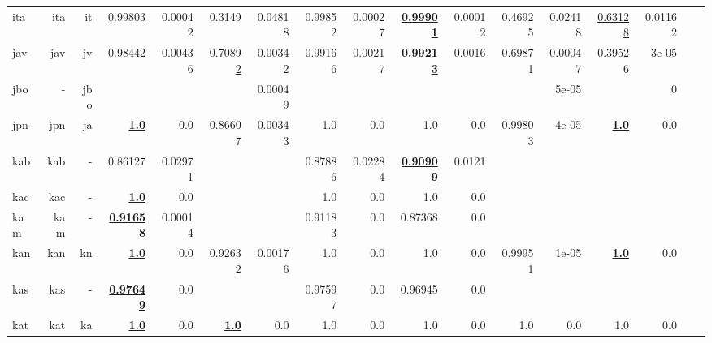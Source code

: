 \documentclass[11pt]{article}
\begin{document}
\begin{table*}[h]
{\begin{tabular}{lrrrrrrrrrrrrrrrr}
ita         & ita         & it         & 0.99803         & 0.00042         & 0.3149         & 0.04818         & 0.99852         & 0.00027         & \textbf{\underline{0.99901}}         & 0.00012         & 0.46925         & 0.02418         & \underline{0.63128}         & 0.01162         \\
jav         & jav         & jv         & 0.98442         & 0.00436         & \underline{0.70892}         & 0.00342         & 0.99166         & 0.00217         & \textbf{\underline{0.99213}}         & 0.0016         & 0.69871         & 0.00047         & 0.39526         & 3e-05         \\
jbo         & -         & jbo         &          &          &          & 0.00049         &          &          &          &          &          & 5e-05         &          & 0         \\
jpn         & jpn         & ja         & \textbf{\underline{1.0}}         & 0.0         & 0.86607         & 0.00343         & 1.0         & 0.0         & 1.0         & 0.0         & 0.99803         & 4e-05         & \textbf{\underline{1.0}}         & 0.0         \\
kab         & kab         & -         & 0.86127         & 0.02971         &          &          & 0.87886         & 0.02284         & \textbf{\underline{0.90909}}         & 0.0121         &          &          &          &          \\
kac         & kac         & -         & \textbf{\underline{1.0}}         & 0.0         &          &          & 1.0         & 0.0         & 1.0         & 0.0         &          &          &          &          \\
kam         & kam         & -         & \textbf{\underline{0.91658}}         & 0.00014         &          &          & 0.91183         & 0.0         & 0.87368         & 0.0         &          &          &          &          \\
kan         & kan         & kn         & \textbf{\underline{1.0}}         & 0.0         & 0.92632         & 0.00176         & 1.0         & 0.0         & 1.0         & 0.0         & 0.99951         & 1e-05         & \textbf{\underline{1.0}}         & 0.0         \\
kas         & kas         & -         & \textbf{\underline{0.97649}}         & 0.0         &          &          & 0.97597         & 0.0         & 0.96945         & 0.0         &          &          &          &          \\
kat         & kat         & ka         & \textbf{\underline{1.0}}         & 0.0         & \textbf{\underline{1.0}}         & 0.0         & 1.0         & 0.0         & 1.0         & 0.0         & 1.0         & 0.0         & 1.0         & 0.0         \\

\end{tabular}}
\end{table*}
\end{document}
